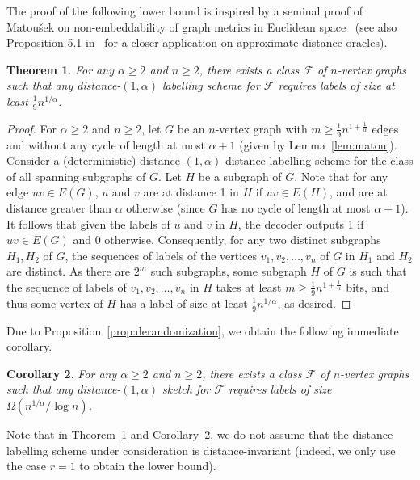 \documentclass[11pt]{article}
\newtheorem{thm}{Theorem}[section]
\newtheorem{corollary}[thm]{Corollary}
\theoremstyle{definition}
\renewcommand{\ge}{\geqslant}
\def\F {{\mathcal F}}
\begin{document}
The proof of the following lower bound is inspired by a seminal proof of Matou\v{s}ek on
non-embeddability of graph metrics in Euclidean space~\cite{Mat96} (see also Proposition 5.1
in~\cite{TZ05} for a closer application on approximate distance oracles). 

\begin{thm}\label{thm:lbdls}
For any $\alpha\ge 2$ and $n\ge 2$, there exists a class
$\F$ of $n$-vertex graphs such that any
 distance-$(1,\alpha)$ labelling scheme for
$\F$ requires labels of size at least $\tfrac19n^{1/\alpha}$. 
\end{thm}

\begin{proof}
For $\alpha\ge 2$ and $n\ge 2$, let $G$ be an $n$-vertex graph with $m\ge \tfrac19 n^{1+\tfrac1{\alpha}}$ edges and without any cycle of
length at most $\alpha+1$ (given by Lemma~\ref{lem:matou}).  Consider
a (deterministic) distance-$(1,\alpha)$ distance labelling scheme for
the class of all spanning subgraphs of $G$. Let
$H$ be a subgraph of $G$. Note that for any edge $uv\in E(G)$, $u$ and
$v$ are at distance 1 in $H$ if $uv\in E(H)$, and are at distance
greater than $\alpha$ otherwise (since $G$ has no cycle of length at most
$\alpha+1$). It follows that given the labels of $u$ and $v$ in $H$, the
decoder outputs 1 if $uv\in E(G)$ and 0 otherwise. Consequently, for
any two distinct subgraphs $H_1,H_2$ of $G$, the sequences of labels
of the vertices $v_1,v_2,\ldots,v_n$ of $G$ in $H_1$ and $H_2$ are
distinct. As there are $2^{m}$ such subgraphs, some subgraph $H$ of
$G$ is such that the sequence of labels of $v_1,v_2,\ldots,v_n$ in $H$
takes at least $m\ge \tfrac19 n^{1+\tfrac1{\alpha}}$ bits, and thus some
vertex of $H$ has a label of size at least $\tfrac19
n^{1/{\alpha}}$, as desired.
\end{proof}

\noindent
Due to Proposition~\ref{prop:derandomization}, we obtain the following immediate corollary.

\begin{corollary}\label{cor:lbdlsrando}
For any $\alpha\ge 2$ and $n\ge 2$, there exists a class
$\F$ of $n$-vertex graphs such that any
 distance-$(1,\alpha)$  sketch for
$\F$ requires labels of size $\Omega(n^{1/\alpha}/\log n)$. 
\end{corollary}

\noindent
Note that in Theorem~\ref{thm:lbdls} and Corollary~\ref{cor:lbdlsrando}, we do not assume that the
distance labelling scheme under consideration is distance-invariant (indeed, we only use the case
$r=1$ to obtain the lower bound). 
\end{document}
